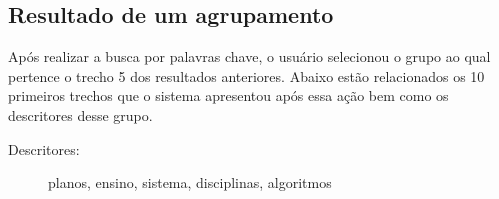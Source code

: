 
\newpage


\subsection*{Resultado de um agrupamento}

Após realizar a busca por palavras chave, o usuário selecionou o grupo ao qual pertence o trecho 5 dos resultados anteriores.
Abaixo estão relacionados os 10 primeiros trechos que o sistema apresentou após essa ação bem como os descritores desse grupo.

\vspace{0.5 cm}






\begin{description}
\item[Descritores: ] planos, ensino, sistema, disciplinas, algoritmos
\end{description}


